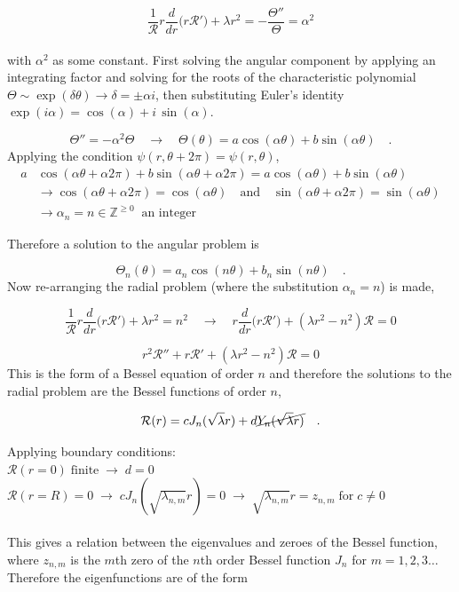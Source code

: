 \documentclass{homework}
\begin{document}
\[ \frac{1}{\mathcal{R}} r \frac{d}{dr} \big(r \mathcal{R'} \big) + \lambda r^2 = -\frac{\Theta''}{\Theta}  = \alpha^2 \]
\\ \noindent
with $\alpha^2$ as some constant. First solving the angular component by applying an integrating factor and solving for the roots of the characteristic polynomial $\Theta \sim \exp(\delta \theta) \rightarrow \delta = \pm \alpha i$, then substituting Euler's identity $\exp(i \alpha) = \cos(\alpha) + i \, \sin(\alpha)$. 

\[ \Theta'' = -\alpha^2 \Theta \quad \rightarrow \quad \Theta (\theta) = a \cos(\alpha \theta) + b \sin(\alpha \theta) \quad .\]
\noindent
Applying the condition $\psi(r, \theta + 2\pi) = \psi(r, \theta)$,
\begin{equation*}
    \begin{split}
        a &\cos(\alpha \theta + \alpha 2 \pi) + b \sin(\alpha \theta + \alpha 2 \pi) = a \cos(\alpha \theta) + b \sin(\alpha \theta) \\
        &\rightarrow  \cos(\alpha \theta + \alpha 2 \pi) = \cos(\alpha \theta) \quad \textrm{and} \quad \sin(\alpha \theta + \alpha 2 \pi) = \sin(\alpha \theta) \\
        &\rightarrow \alpha_n = n \in \mathbb{Z}^{\geq 0} \;\; \textrm{an integer}
    \end{split}
\end{equation*}

\noindent
Therefore a solution to the angular problem is

\[\Theta_n (\theta) = a_n \cos(n \theta) + b_n \sin(n \theta) \quad . \]
\newpage
\noindent
Now re-arranging the radial problem (where the substitution $\alpha_n = n$) is made,

\[ \frac{1}{\mathcal{R}} r \frac{d}{dr} \big(r \mathcal{R'} \big) + \lambda r^2 = n^2 \quad \rightarrow \quad r \frac{d}{dr} \big(r \mathcal{R'} \big) + (\lambda r^2 - n^2) \mathcal{R} = 0 \]

\[ r^2 \mathcal{R}'' + r \mathcal{R}' + (\lambda r^2 - n^2) \mathcal{R} = 0 \]
\noindent 
This is the form of a Bessel equation of order $n$ and therefore the solutions to the radial problem are the Bessel functions of order $n$,

\[\mathcal{R}(r) = c J_n (\sqrt{\lambda} r) + d \cancel{Y_n (\sqrt{\lambda} r)} \quad .\]

\noindent
Applying boundary conditions: \\
\noindent $\mathcal{R}(r = 0) \; \textrm{finite} \; \rightarrow \; d = 0$ \\
\noindent $\mathcal{R}(r = R) = 0 \; \rightarrow \; c J_n (\sqrt{\lambda_{n,m}} r) = 0 \; \rightarrow \; \sqrt{\lambda_{n,m}} r = z_{n,m} \; \textrm{for} \; c \neq 0$ \\ \\ \noindent
This gives a relation between the eigenvalues and zeroes of the Bessel function,  where $z_{n,m}$ is the $m$th zero of the $n$th order Bessel function $J_n$ for $m = 1,2,3 \dots$ Therefore the eigenfunctions  are of the form 
\end{document}
